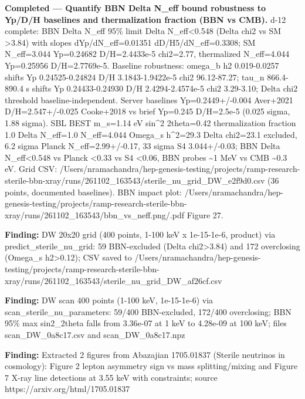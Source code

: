 \documentclass[11pt,a4paper]{article}
\begin{document}
\textbf{Completed --- Quantify BBN Delta N\_eff bound robustness to Yp/D/H baselines and thermalization fraction (BBN vs CMB).} d-12 complete: BBN Delta N\_eff 95\% limit Delta N\_eff\textless{}0.548 (Delta chi2 vs SM \textgreater{}3.84) with slopes dYp/dN\_eff=0.01351 dD/H5/dN\_eff=0.3308; SM N\_eff=3.044 Yp=0.24682 D/H=2.4433e-5 chi2=2.77, thermalized N\_eff=4.044 Yp=0.25956 D/H=2.7769e-5. Baseline robustness: omega\_b h2 0.019-0.0257 shifts Yp 0.24525-0.24824 D/H 3.1843-1.9422e-5 chi2 96.12-87.27; tau\_n 866.4-890.4 s shifts Yp 0.24433-0.24930 D/H 2.4294-2.4574e-5 chi2 3.29-3.10; Delta chi2 threshold baseline-independent. Server baselines Yp=0.2449+/-0.004 Aver+2021 D/H=2.547+/-0.025 Cooke+2018 vs brief Yp=0.245 D/H=2.5e-5 (0.025 sigma, 1.88 sigma). SBL BEST m\_s=1.14 eV sin\textasciicircum{}2 2theta=0.42 thermalization fraction 1.0 Delta N\_eff=1.0 N\_eff=4.044 Omega\_s h\textasciicircum{}2=29.3 Delta chi2=23.1 excluded, 6.2 sigma Planck N\_eff=2.99+/-0.17, 33 sigma S4 3.044+/-0.03; BBN Delta N\_eff\textless{}0.548 vs Planck \textless{}0.33 vs S4 \textless{}0.06, BBN probes \textasciitilde{}1 MeV vs CMB \textasciitilde{}0.3 eV. Grid CSV: /Users/nramachandra/hep-genesis-testing/projects/ramp-research-sterile-bbn-xray/runs/261102\_163543/sterile\_nu\_grid\_DW\_e2f9d0.csv (36 points, documented baselines). BBN impact plot: /Users/nramachandra/hep-genesis-testing/projects/ramp-research-sterile-bbn-xray/runs/261102\_163543/bbn\_vs\_neff.png/.pdf Figure 27.

\textbf{Finding:} DW 20x20 grid (400 points, 1-100 keV x 1e-15-1e-6, product) via predict\_sterile\_nu\_grid: 59 BBN-excluded (Delta chi2\textgreater{}3.84) and 172 overclosing (Omega\_s h2\textgreater{}0.12); CSV saved to /Users/nramachandra/hep-genesis-testing/projects/ramp-research-sterile-bbn-xray/runs/261102\_163543/sterile\_nu\_grid\_DW\_af26cf.csv

\textbf{Finding:} DW scan 400 points (1-100 keV, 1e-15-1e-6) via scan\_sterile\_nu\_parameters: 59/400 BBN-excluded, 172/400 overclosing; BBN 95\% max sin2\_2theta falls from 3.36e-07 at 1 keV to 4.28e-09 at 100 keV; files scan\_DW\_0a8c17.csv and scan\_DW\_0a8c17.npz

\textbf{Finding:} Extracted 2 figures from Abazajian 1705.01837 (Sterile neutrinos in cosmology): Figure 2 lepton asymmetry sign vs mass splitting/mixing and Figure 7 X-ray line detections at 3.55 keV with constraints; source https://arxiv.org/html/1705.01837
\end{document}

